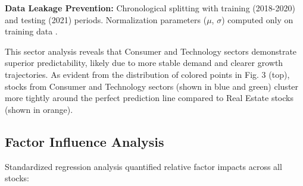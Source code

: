 \documentclass[3p,times,procedia]{elsarticle}
\begin{document}
\textbf{Data Leakage Prevention:} Chronological splitting with training (2018-2020) and testing (2021) periods. Normalization parameters ($\mu$, $\sigma$) computed only on training data \cite{Fischer2018}.

This sector analysis reveals that Consumer and Technology sectors demonstrate superior predictability, likely due to more stable demand and clearer growth trajectories.
As evident from the distribution of colored points in Fig. 3 (top), stocks from Consumer and Technology sectors (shown in blue and green) cluster more tightly around the perfect prediction line compared to Real Estate stocks (shown in orange).


\begin{table}[!ht]
\centering
\caption{\textbf{Market Capitalization Impact on Prediction Accuracy}}
\end{table}


\FloatBarrier
\subsection{Factor Influence Analysis}
Standardized regression analysis quantified relative factor impacts across all stocks:
\end{document}
